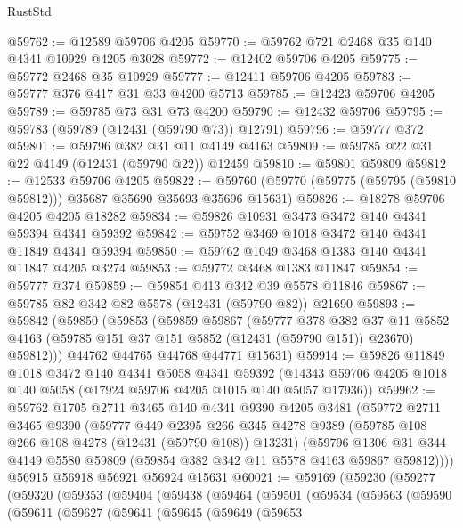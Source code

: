 \begin{lexlean}{RustStd}
\begin{coremodule}
@59762 := @12589 @59706 @4205
@59770 := @59762 @721 @2468 @35 @140 @4341 @10929 @4205 @3028
@59772 := @12402 @59706 @4205
@59775 := @59772 @2468 @35 @10929
@59777 := @12411 @59706 @4205
@59783 := @59777 @376 @417 @31 @33 @4200 @5713
@59785 := @12423 @59706 @4205
@59789 := @59785 @73 @31 @73 @4200
@59790 := @12432 @59706
@59795 := @59783 (@59789 (@12431 (@59790 @73)) @12791)
@59796 := @59777 @372
@59801 := @59796 @382 @31 @11 @4149 @4163
@59809 := @59785 @22 @31 @22 @4149 (@12431 (@59790 @22)) @12459
@59810 := @59801 @59809
@59812 := @12533 @59706 @4205
@59822 := @59760 (@59770 (@59775 (@59795 (@59810 @59812))) @35687 @35690 @35693 @35696 @15631)
@59826 := @18278 @59706 @4205 @4205 @18282
@59834 := @59826 @10931 @3473 @3472 @140 @4341 @59394 @4341 @59392
@59842 := @59752 @3469 @1018 @3472 @140 @4341 @11849 @4341 @59394
@59850 := @59762 @1049 @3468 @1383 @140 @4341 @11847 @4205 @3274
@59853 := @59772 @3468 @1383 @11847
@59854 := @59777 @374
@59859 := @59854 @413 @342 @39 @5578 @11846
@59867 := @59785 @82 @342 @82 @5578 (@12431 (@59790 @82)) @21690
@59893 := @59842
    (@59850
      (@59853
        (@59859
          @59867
          (@59777
            @378
            @382
            @37
            @11
            @5852
            @4163
            (@59785 @151 @37 @151 @5852 (@12431 (@59790 @151)) @23670)
            @59812)))
      @44762
      @44765
      @44768
      @44771
      @15631)
@59914 := @59826
    @11849
    @1018
    @3472
    @140
    @4341
    @5058
    @4341
    @59392
    (@14343 @59706 @4205 @1018 @140 @5058 (@17924 @59706 @4205 @1015 @140 @5057 @17936))
@59962 := @59762
    @1705
    @2711
    @3465
    @140
    @4341
    @9390
    @4205
    @3481
    (@59772
      @2711
      @3465
      @9390
      (@59777
        @449
        @2395
        @266
        @345
        @4278
        @9389
        (@59785 @108 @266 @108 @4278 (@12431 (@59790 @108)) @13231)
        (@59796
          @1306
          @31
          @344
          @4149
          @5580
          @59809
          (@59854 @382 @342 @11 @5578 @4163 @59867 @59812))))
    @56915
    @56918
    @56921
    @56924
    @15631
@60021 := @59169
    (@59230
      (@59277
        (@59320
          (@59353
            (@59404
              (@59438
                (@59464
                  (@59501
                    (@59534
                      (@59563
                        (@59590
                          (@59611
                            (@59627
                              (@59641
                                (@59645
                                  (@59649
                                    (@59653

\end{coremodule}
\end{lexlean}
